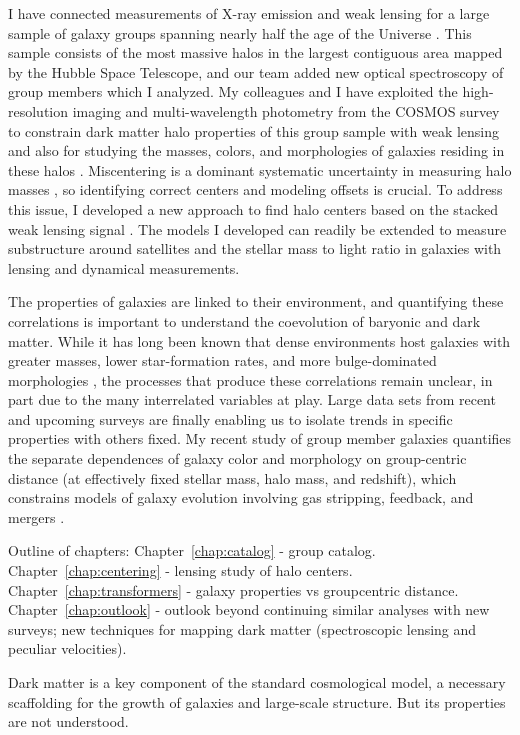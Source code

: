 I have connected measurements of X-ray
emission and weak lensing for a large sample of galaxy groups spanning
nearly half the age of the Universe \citep{George2011}. This sample
consists of the most massive halos in the largest contiguous area
mapped by the Hubble Space Telescope, and our team added new
optical spectroscopy of group members which I analyzed. My colleagues
and I have exploited the high-resolution imaging and multi-wavelength photometry from the
COSMOS survey to constrain dark
matter halo properties of this group sample with weak lensing \citep{Leauthaud2010,
  George2012, Schmidt2012, Ford2012, Taylor2012} and also for studying
the masses, colors, and morphologies of galaxies residing in these
halos \citep{George2011, George2013, Leauthaud2012b}.
Miscentering is a dominant systematic uncertainty
in measuring halo masses \citep{Rozo2011}, so identifying
correct centers and modeling offsets is crucial. To address this
issue, I developed a new approach to find halo centers based on the
stacked weak lensing signal \citep{George2012}. The models I
developed can readily be extended to measure substructure around
satellites and the stellar mass to light ratio in galaxies with
lensing and dynamical measurements.

The properties of galaxies are linked to their environment, and
quantifying these correlations is important to understand the
coevolution of baryonic and dark matter. While it has long been known
that dense environments host galaxies with greater masses, lower
star-formation rates, and more bulge-dominated morphologies
\citep[see][for a review]{Blanton2009}, the processes that produce these
correlations remain unclear, in part due to the many interrelated
variables at play. Large data sets from recent and upcoming surveys
are finally enabling us to isolate trends in specific properties with
others fixed. My recent study of group member galaxies quantifies
the separate dependences of galaxy color and morphology on
group-centric distance (at effectively fixed stellar mass, halo mass,
and redshift), which constrains models of galaxy evolution involving
gas stripping, feedback, and mergers \citep{George2013}.


Outline of chapters:
Chapter~\ref{chap:catalog} - group catalog.
Chapter~\ref{chap:centering} - lensing study of halo centers.
Chapter~\ref{chap:transformers} - galaxy properties vs groupcentric
distance.
Chapter~\ref{chap:outlook} - outlook beyond continuing similar
analyses with new surveys; new techniques for mapping dark matter
(spectroscopic lensing and peculiar velocities).







Dark matter is a key component of the standard cosmological model, a
necessary scaffolding for the growth of galaxies and large-scale
structure. But its properties are not understood. 
